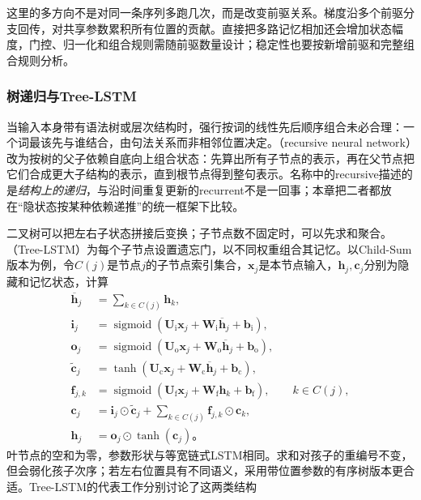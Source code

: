 这里的多方向不是对同一条序列多跑几次，而是改变前驱关系。梯度沿多个前驱分支回传，对共享参数累积所有位置的贡献。直接把多路记忆相加还会增加状态幅度，门控、归一化和组合规则需随前驱数量设计；稳定性也要按新增前驱和完整组合规则分析。

\subsubsection{树递归与Tree-LSTM}
\label{sec:rnn-tree}

当输入本身带有语法树或层次结构时，强行按词的线性先后顺序组合未必合理：一个词最该先与谁结合，由句法关系而非相邻位置决定。（recursive neural network）改为按树的父子依赖自底向上组合状态：先算出所有子节点的表示，再在父节点把它们合成更大子结构的表示，直到根节点得到整句表示。名称中的recursive描述的是\emph{结构上的递归}，与沿时间重复更新的recurrent不是一回事；本章把二者都放在“隐状态按某种依赖递推”的统一框架下比较。

二叉树可以把左右子状态拼接后变换；子节点数不固定时，可以先求和聚合。（Tree-LSTM）为每个子节点设置遗忘门，以不同权重组合其记忆。以Child-Sum版本为例，令$C(j)$是节点$j$的子节点索引集合，$\bm{x}_j$是本节点输入，$\bm{h}_j,\bm{c}_j$分别为隐藏和记忆状态，计算
\begin{equation}
  \begin{aligned}
    \overline{\bm{h}}_j&=\sum_{k\in C(j)}\bm{h}_k,\\
    \bm{i}_j&=\operatorname{sigmoid}\!\left(
       \bm{U}_{\mathrm{i}}\bm{x}_j+\bm{W}_{\mathrm{i}}\overline{\bm{h}}_j
       +\bm{b}_{\mathrm{i}}\right),\\
    \bm{o}_j&=\operatorname{sigmoid}\!\left(
       \bm{U}_{\mathrm{o}}\bm{x}_j+\bm{W}_{\mathrm{o}}\overline{\bm{h}}_j
       +\bm{b}_{\mathrm{o}}\right),\\
    \widetilde{\bm{c}}_j&=\tanh\!\left(
       \bm{U}_{\mathrm{c}}\bm{x}_j+\bm{W}_{\mathrm{c}}\overline{\bm{h}}_j
       +\bm{b}_{\mathrm{c}}\right),\\
    \bm{f}_{j,k}&=\operatorname{sigmoid}\!\left(
       \bm{U}_{\mathrm{f}}\bm{x}_j+\bm{W}_{\mathrm{f}}\bm{h}_k
       +\bm{b}_{\mathrm{f}}\right),\qquad k\in C(j),\\
    \bm{c}_j&=\bm{i}_j\odot\widetilde{\bm{c}}_j
        +\sum_{k\in C(j)}\bm{f}_{j,k}\odot\bm{c}_k,\\
    \bm{h}_j&=\bm{o}_j\odot\tanh(\bm{c}_j)\text{。}
  \end{aligned}
  \label{eq:rnn-tree-lstm}
\end{equation}
叶节点的空和为零，参数形状与等宽链式LSTM相同。求和对孩子的重编号不变，但会弱化孩子次序；若左右位置具有不同语义，采用带位置参数的有序树版本更合适。Tree-LSTM的代表工作分别讨论了这两类结构

